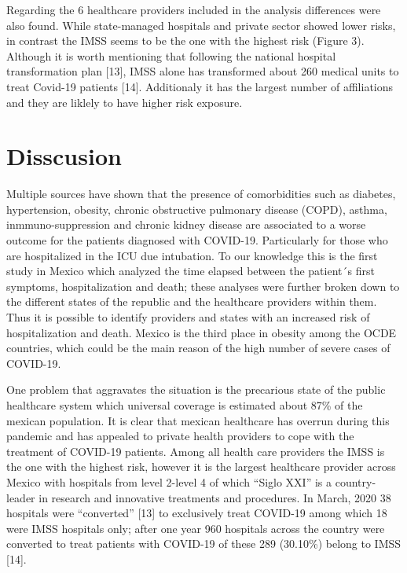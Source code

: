 \documentclass[10pt,letterpaper]{article}
\begin{document}
Regarding the 6 healthcare providers included in the analysis
differences were also found. While state-managed hospitals and private
sector showed lower risks, in contrast the IMSS seems to be the one with
the highest risk (Figure 3). Although it is worth mentioning that
following the national hospital transformation plan {[}13{]}, IMSS alone
has transformed about 260 medical units to treat Covid-19 patients
{[}14{]}. Additionaly it has the largest number of affiliations and they
are liklely to have higher risk exposure.

\hypertarget{disscusion}{%
\section{Disscusion}\label{disscusion}}

Multiple sources have shown that the presence of comorbidities such as
diabetes, hypertension, obesity, chronic obstructive pulmonary disease
(COPD), asthma, inmmuno-suppression and chronic kidney disease are
associated to a worse outcome for the patients diagnosed with COVID-19.
Particularly for those who are hospitalized in the ICU due intubation.
To our knowledge this is the first study in Mexico which analyzed the
time elapsed between the patient´s first symptoms, hospitalization and
death; these analyses were further broken down to the different states
of the republic and the healthcare providers within them. Thus it is
possible to identify providers and states with an increased risk of
hospitalization and death. Mexico is the third place in obesity among
the OCDE countries, which could be the main reason of the high number of
severe cases of COVID-19.

One problem that aggravates the situation is the precarious state of the
public healthcare system which universal coverage is estimated about
87\% of the mexican population. It is clear that mexican healthcare has
overrun during this pandemic and has appealed to private health
providers to cope with the treatment of COVID-19 patients. Among all
health care providers the IMSS is the one with the highest risk, however
it is the largest healthcare provider across Mexico with hospitals from
level 2-level 4 of which ``Siglo XXI'' is a country-leader in research
and innovative treatments and procedures. In March, 2020 38 hospitals
were ``converted'' {[}13{]} to exclusively treat COVID-19 among which 18
were IMSS hospitals only; after one year 960 hospitals across the
country were converted to treat patients with COVID-19 of these 289
(30.10\%) belong to IMSS {[}14{]}.
\end{document}
